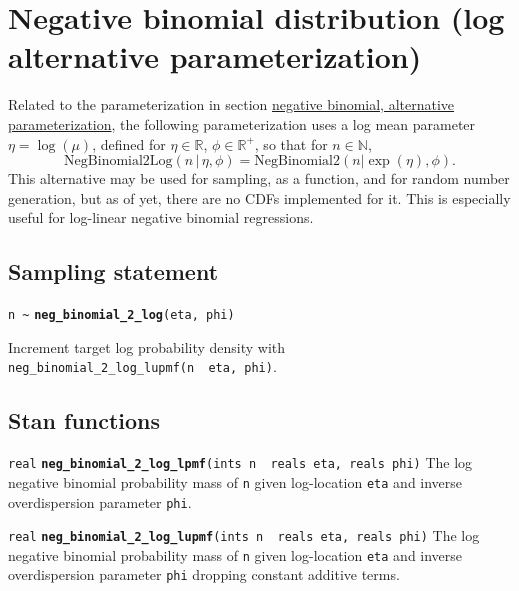 \documentclass[
  10pt,
]{book}
\begin{document}
\hypertarget{neg-binom-2-log}{%
\section{Negative binomial distribution (log alternative parameterization)}\label{neg-binom-2-log}}

Related to the parameterization in section \protect\hyperlink{nbalt}{negative binomial, alternative parameterization}, the following
parameterization uses a log mean parameter \(\eta = \log(\mu)\), defined
for \(\eta \in \mathbb{R}\), \(\phi \in \mathbb{R}^+\), so that for \(n \in \mathbb{N}\), \[ \text{NegBinomial2Log}(n \, | \, \eta, \phi) =
\text{NegBinomial2}(n | \exp(\eta), \phi). \] This alternative may be
used for sampling, as a function, and for random number generation,
but as of yet, there are no CDFs implemented for it. This is especially useful
for log-linear negative binomial regressions.

\hypertarget{sampling-statement-15}{%
\subsection{Sampling statement}\label{sampling-statement-15}}

\texttt{n\ \textasciitilde{}} \textbf{\texttt{neg\_binomial\_2\_log}}\texttt{(eta,\ phi)}

Increment target log probability density with \texttt{neg\_binomial\_2\_log\_lupmf(n\ \textbar{}\ eta,\ phi)}.

\hypertarget{stan-functions-14}{%
\subsection{Stan functions}\label{stan-functions-14}}


\texttt{real} \textbf{\texttt{neg\_binomial\_2\_log\_lpmf}}\texttt{(ints\ n\ \textbar{}\ reals\ eta,\ reals\ phi)}\newline
The log negative binomial probability mass of \texttt{n} given log-location \texttt{eta}
and inverse overdispersion parameter \texttt{phi}.


\texttt{real} \textbf{\texttt{neg\_binomial\_2\_log\_lupmf}}\texttt{(ints\ n\ \textbar{}\ reals\ eta,\ reals\ phi)}\newline
The log negative binomial probability mass of \texttt{n} given log-location \texttt{eta}
and inverse overdispersion parameter \texttt{phi} dropping constant additive terms.
\end{document}
